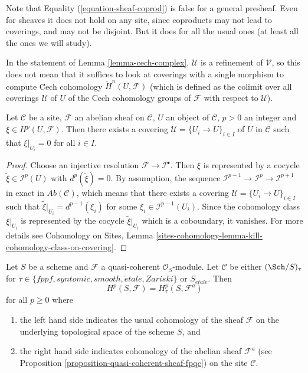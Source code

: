 \noindent
Note that Equality (\ref{equation-sheaf-coprod})
is false for a general presheaf. Even for sheaves it does not hold on any
site, since coproducts may not lead to coverings, and may not be disjoint.
But it does for all the usual ones (at least all the ones we will study).

\begin{remark}
\label{remark-refinement}
In the statement of
Lemma \ref{lemma-cech-complex},
$\mathcal{U}$ is a refinement of $\mathcal{V}$,
so this does not mean that it suffices to look at coverings with a single
morphism to compute \u Cech cohomology $\check H^n(U, \mathcal{F})$ (which
is defined as the colimit over all coverings $\mathcal{U}$ of $U$ of the
Cech cohomology groups of $\mathcal{F}$ with respect to $\mathcal{U}$).
\end{remark}

\begin{lemma}
\label{lemma-locality-cohomology}
Let $\mathcal{C}$ be a site, $\mathcal{F}$ an abelian sheaf on $\mathcal{C}$,
$U$ an object of $\mathcal{C}$, $p >0$ an integer and $\xi \in
H^p(U, \mathcal{F})$. Then there exists a covering
$\mathcal{U} = \{U_i \to U\}_{i \in I}$ of $U$ in $\mathcal{C}$
such that $\xi |_{U_i} = 0$ for all $i \in I$.
\end{lemma}

\begin{proof}
Choose an injective resolution $\mathcal{F} \to \mathcal{I}^\bullet$. Then
$\xi$ is represented by a cocycle $\tilde{\xi} \in \mathcal{I}^p(U)$
with $d^p(\tilde{\xi}) = 0$. By assumption, the sequence
$\mathcal{I}^{p - 1} \to \mathcal{I}^p \to \mathcal{I}^{p + 1}$ in exact in
$\textit{Ab}(\mathcal{C})$, which means that there exists a covering
$\mathcal{U} = \{U_i \to U\}_{i \in I}$ such that
$\tilde{\xi}|_{U_i} = d^{p - 1}(\xi_i)$ for some
$\xi_i \in \mathcal{I}^{p-1}(U_i)$. Since
the cohomology class $\xi|_{U_i}$ is represented by the cocycle
$\tilde{\xi}|_{U_i}$ which is a coboundary, it vanishes.
For more details see
Cohomology on Sites,
Lemma \ref{sites-cohomology-lemma-kill-cohomology-class-on-covering}.
\end{proof}

\begin{theorem}
\label{theorem-zariski-fpqc-quasi-coherent}
Let $S$ be a scheme and $\mathcal{F}$ a quasi-coherent $\mathcal{O}_S$-module.
Let $\mathcal{C}$ be either $(\Sch/S)_\tau$ for
$\tau \in \{fppf, syntomic, smooth, \acute{e}tale, Zariski\}$ or
$S_{\acute{e}tale}$. Then
$$
H^p(S, \mathcal{F}) = H^p_\tau(S, \mathcal{F}^a)
$$
for all $p \geq 0$ where
\begin{enumerate}
\item the left hand side indicates the usual cohomology of the sheaf
$\mathcal{F}$ on the underlying topological space of the scheme $S$, and
\item the right hand side indicates cohomology
of the abelian sheaf $\mathcal{F}^a$ (see
Proposition \ref{proposition-quasi-coherent-sheaf-fpqc})
on the site $\mathcal{C}$.
\end{enumerate}
\end{theorem}

